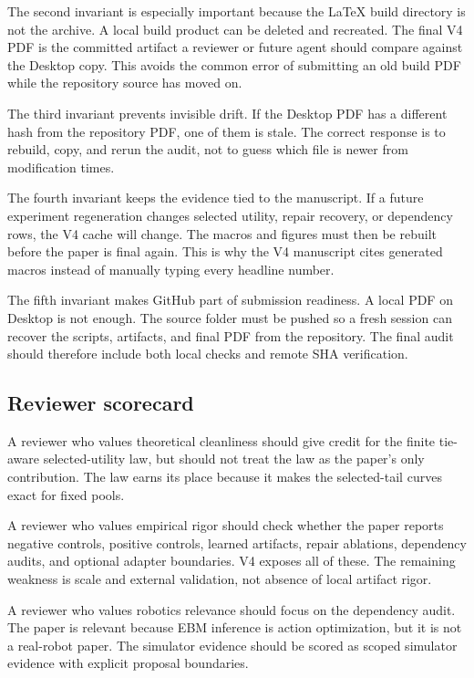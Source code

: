 The second invariant is especially important because the LaTeX build
directory is not the archive. A local build product can be deleted and
recreated. The final V4 PDF is the committed artifact a reviewer or future
agent should compare against the Desktop copy. This avoids the common error
of submitting an old build PDF while the repository source has moved on.

The third invariant prevents invisible drift. If the Desktop PDF has a
different hash from the repository PDF, one of them is stale. The correct
response is to rebuild, copy, and rerun the audit, not to guess which file is
newer from modification times.

The fourth invariant keeps the evidence tied to the manuscript. If a future
experiment regeneration changes selected utility, repair recovery, or
dependency rows, the V4 cache will change. The macros and figures must then be
rebuilt before the paper is final again. This is why the V4 manuscript cites
generated macros instead of manually typing every headline number.

The fifth invariant makes GitHub part of submission readiness. A local PDF on
Desktop is not enough. The source folder must be pushed so a fresh session can
recover the scripts, artifacts, and final PDF from the repository. The final
audit should therefore include both local checks and remote SHA verification.

\subsection{Reviewer scorecard}
\label{app:V4-scorecard}

A reviewer who values theoretical cleanliness should give credit for the
finite tie-aware selected-utility law, but should not treat the law as the
paper's only contribution. The law earns its place because it makes the
selected-tail curves exact for fixed pools.

A reviewer who values empirical rigor should check whether the paper reports
negative controls, positive controls, learned artifacts, repair ablations,
dependency audits, and optional adapter boundaries. V4 exposes all of these.
The remaining weakness is scale and external validation, not absence of local
artifact rigor.

A reviewer who values robotics relevance should focus on the dependency audit.
The paper is relevant because EBM inference is action optimization, but it is
not a real-robot paper. The simulator evidence should be scored as scoped
simulator evidence with explicit proposal boundaries.

